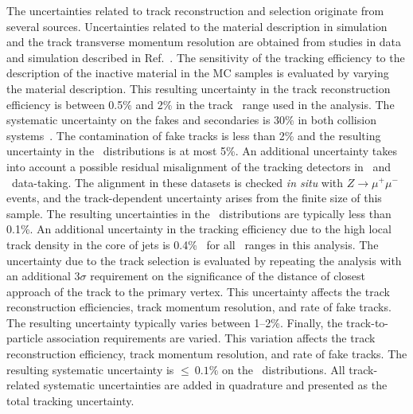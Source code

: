 The uncertainties related to track reconstruction and selection originate from several sources.
Uncertainties related to the material description in simulation and the track transverse momentum resolution are obtained from studies in data and simulation described in Ref.~\cite{ATL-PHYS-PUB-2015-051}.
The sensitivity of the tracking efficiency to the description of the inactive material in the MC samples is evaluated by varying the material description.
This resulting uncertainty in the track reconstruction efficiency is between 0.5\% and 2\% in the track \pT\ range used in the analysis.
The systematic uncertainty on the fakes and secondaries is 30\% in both collision systems~\cite{ATL-PHYS-PUB-2015-051}.
The contamination of fake tracks is less than 2\% and the resulting uncertainty in the \Dptr\ distributions is at most 5\%.
An additional uncertainty takes into account a possible residual misalignment of the tracking detectors in \pp\ and \PbPb\ data-taking.
The alignment in these datasets is checked \textit{in situ} with $Z\rightarrow \mu^{+}\mu^{-}$ events, and the track-\pT\-dependent uncertainty arises from the finite size of this sample.
The resulting uncertainties in the \Dptr\ distributions are typically less than 0.1\%.
An additional uncertainty in the tracking efficiency due to the high local track density in the core of jets is 0.4\%~\cite{ATL-PHYS-PUB-2016-007} for all \ptjet\ ranges in this analysis.
The uncertainty due to the track selection is evaluated by repeating the analysis with an additional $3\sigma$ requirement on the significance of the distance of closest approach of the track to the primary vertex.
This uncertainty affects the track reconstruction efficiencies, track momentum resolution, and rate of fake tracks.
The resulting uncertainty typically varies between 1--2\%.
Finally, the track-to-particle association requirements are varied.
This variation affects the track reconstruction efficiency, track momentum resolution, and rate of fake tracks.
The resulting systematic uncertainty is $\leq~0.1 \%$ on the \Dptr\ distributions.
All track-related systematic uncertainties are added in quadrature and presented as the total tracking uncertainty.


